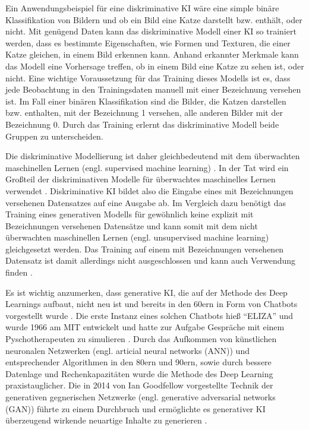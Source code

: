 Ein Anwendungsbeispiel für eine diskriminative KI wäre eine simple binäre Klassifikation von Bildern und ob ein Bild eine Katze darstellt bzw. enthält, oder nicht.
Mit genügend Daten kann das diskriminative Modell einer KI so trainiert werden, dass es bestimmte Eigenschaften, wie Formen und Texturen, die einer Katze gleichen, in einem Bild erkennen kann.
Anhand erkannter Merkmale kann das Modell eine Vorhersage treffen, ob in einem Bild eine Katze zu sehen ist, oder nicht.
Eine wichtige Voraussetzung für das Training dieses Modells ist es, dass jede Beobachtung in den Trainingsdaten manuell mit einer Bezeichnung versehen ist.
Im Fall einer binären Klassifikation sind die Bilder, die Katzen darstellen bzw. enthalten, mit der Bezeichnung 1 versehen, alle anderen Bilder mit der Bezeichnung 0.
Durch das Training erlernt das diskriminative Modell beide Gruppen zu unterscheiden.

Die diskriminative Modellierung ist daher gleichbedeutend mit dem überwachten maschinellen Lernen (engl. supervised machine learning) \cite{orlly-deep-gen-learning}.
In der Tat wird ein Großteil der diskriminativen Modelle für überwachtes maschinelles Lernen verwendet \cite{turing-genai}.
Diskriminative KI bildet also die Eingabe eines mit Bezeichnungen versehenen Datensatzes auf eine Ausgabe ab.
Im Vergleich dazu benötigt das Training eines generativen Modells für gewöhnlich keine explizit mit Bezeichnungen versehenen Datensätze und kann somit mit dem nicht überwachten maschinellen Lernen (engl. unsupervised machine learning) gleichgesetzt werden.
Das Training auf einem mit Bezeichnungen versehenen Datensatz ist damit allerdings nicht ausgeschlossen und kann auch Verwendung finden \cite{orlly-deep-gen-learning}.

Es ist wichtig anzumerken, dass generative KI, die auf der Methode des Deep Learnings aufbaut, nicht neu ist und bereits in den 60ern in Form von Chatbots vorgestellt wurde \cite{gen-ai-tech-target}.
Die erste Instanz eines solchen Chatbots hieß \enquote{ELIZA} \cite{eliza} und wurde 1966 am MIT entwickelt und hatte zur Aufgabe Gespräche mit einem Pyschotherapeuten zu simulieren \cite{computer-woche-genai}.
Durch das Aufkommen von künstlichen neuronalen Netzwerken (engl. articial neural networks (ANN)) und entsprechender Algorithmen in den 80ern und 90ern, sowie durch bessere Datenlage und Rechenkapazitäten wurde die Methode des Deep Learning praxistauglicher.
Die in 2014 von Ian Goodfellow vorgestellte Technik der generativen gegnerischen Netzwerke (engl. generative adversarial networks (GAN)) führte zu einem Durchbruch und ermöglichte es generativer KI überzeugend wirkende neuartige Inhalte zu generieren \cite{medium-genai-history}.

